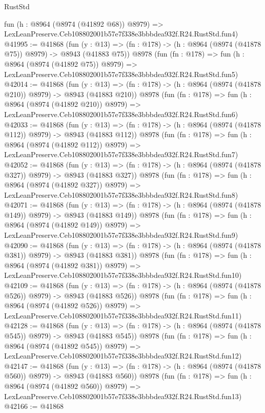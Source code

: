 \begin{lexlean}{RustStd}
\begin{coremodule}
    fun (h : @8964 (@8974 (@41892 @68)) @8979) =>
    LexLeanPreserve.Ceb108802001b57e7f338e3bbbdea932f.R24.RustStd.fun4)
@41995 := @41868
    (fun (y : @13) => (fn : @178) -> (h : @8964 (@8974 (@41878 @75)) @8979) -> @8943 (@41883 @75))
    @8978
    (fun (fn : @178) =>
    fun (h : @8964 (@8974 (@41892 @75)) @8979) =>
    LexLeanPreserve.Ceb108802001b57e7f338e3bbbdea932f.R24.RustStd.fun5)
@42014 := @41868
    (fun (y : @13) => (fn : @178) -> (h : @8964 (@8974 (@41878 @210)) @8979) -> @8943 (@41883 @210))
    @8978
    (fun (fn : @178) =>
    fun (h : @8964 (@8974 (@41892 @210)) @8979) =>
    LexLeanPreserve.Ceb108802001b57e7f338e3bbbdea932f.R24.RustStd.fun6)
@42033 := @41868
    (fun (y : @13) => (fn : @178) -> (h : @8964 (@8974 (@41878 @112)) @8979) -> @8943 (@41883 @112))
    @8978
    (fun (fn : @178) =>
    fun (h : @8964 (@8974 (@41892 @112)) @8979) =>
    LexLeanPreserve.Ceb108802001b57e7f338e3bbbdea932f.R24.RustStd.fun7)
@42052 := @41868
    (fun (y : @13) => (fn : @178) -> (h : @8964 (@8974 (@41878 @327)) @8979) -> @8943 (@41883 @327))
    @8978
    (fun (fn : @178) =>
    fun (h : @8964 (@8974 (@41892 @327)) @8979) =>
    LexLeanPreserve.Ceb108802001b57e7f338e3bbbdea932f.R24.RustStd.fun8)
@42071 := @41868
    (fun (y : @13) => (fn : @178) -> (h : @8964 (@8974 (@41878 @149)) @8979) -> @8943 (@41883 @149))
    @8978
    (fun (fn : @178) =>
    fun (h : @8964 (@8974 (@41892 @149)) @8979) =>
    LexLeanPreserve.Ceb108802001b57e7f338e3bbbdea932f.R24.RustStd.fun9)
@42090 := @41868
    (fun (y : @13) => (fn : @178) -> (h : @8964 (@8974 (@41878 @381)) @8979) -> @8943 (@41883 @381))
    @8978
    (fun (fn : @178) =>
    fun (h : @8964 (@8974 (@41892 @381)) @8979) =>
    LexLeanPreserve.Ceb108802001b57e7f338e3bbbdea932f.R24.RustStd.fun10)
@42109 := @41868
    (fun (y : @13) => (fn : @178) -> (h : @8964 (@8974 (@41878 @526)) @8979) -> @8943 (@41883 @526))
    @8978
    (fun (fn : @178) =>
    fun (h : @8964 (@8974 (@41892 @526)) @8979) =>
    LexLeanPreserve.Ceb108802001b57e7f338e3bbbdea932f.R24.RustStd.fun11)
@42128 := @41868
    (fun (y : @13) => (fn : @178) -> (h : @8964 (@8974 (@41878 @545)) @8979) -> @8943 (@41883 @545))
    @8978
    (fun (fn : @178) =>
    fun (h : @8964 (@8974 (@41892 @545)) @8979) =>
    LexLeanPreserve.Ceb108802001b57e7f338e3bbbdea932f.R24.RustStd.fun12)
@42147 := @41868
    (fun (y : @13) => (fn : @178) -> (h : @8964 (@8974 (@41878 @560)) @8979) -> @8943 (@41883 @560))
    @8978
    (fun (fn : @178) =>
    fun (h : @8964 (@8974 (@41892 @560)) @8979) =>
    LexLeanPreserve.Ceb108802001b57e7f338e3bbbdea932f.R24.RustStd.fun13)
@42166 := @41868

\end{coremodule}
\end{lexlean}
